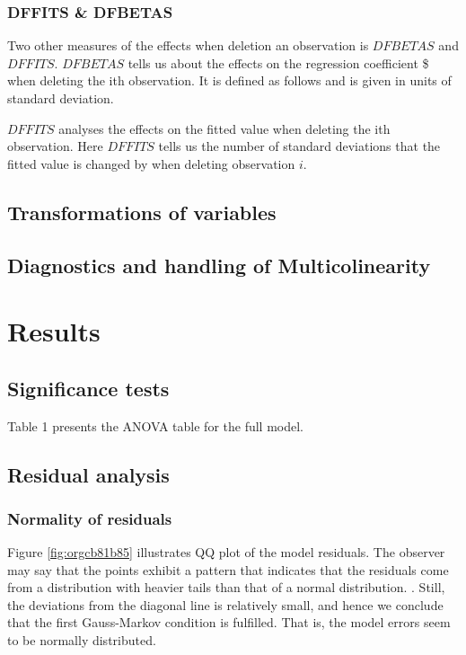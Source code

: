 \documentclass[11pt]{article}
\begin{document}
\subsubsection{DFFITS \& DFBETAS}
\label{sec:org8e95685}

Two other measures of the effects when deletion an observation is \(DFBETAS\) and \(DFFITS\). \(DFBETAS\) tells us
about the effects on the regression coefficient \$ when deleting the ith observation. It is defined as
follows and is given in units of standard deviation.

\(DFFITS\) analyses the effects on the fitted value when deleting the ith observation. Here \(DFFITS\) tells us
the number of standard deviations that the fitted value is changed by when deleting observation \(i\).

\subsection{Transformations of variables}
\label{sec:org3677575}
\subsection{Diagnostics and handling of Multicolinearity}
\label{sec:org03de7a2}
\newpage
\section{Results}
\label{sec:org133eef2}
\subsection{Significance tests}
\label{sec:orgaacf901}

Table 1 presents the ANOVA table for the full model. 



\subsection{Residual analysis}
\label{sec:org26d8deb}
\subsubsection{Normality of residuals}
\label{sec:orgc01b830}

Figure \ref{fig:orgcb81b85} illustrates QQ plot of the model residuals. The observer may say that the 
points exhibit a pattern that indicates that the residuals come from a distribution with heavier tails
than that of a normal distribution. 
\cite{Montgomery2012}. Still, the deviations from the diagonal line is relatively small, and hence
we conclude that the first Gauss-Markov condition is fulfilled. That is, the model errors seem to be 
normally distributed.
\end{document}
